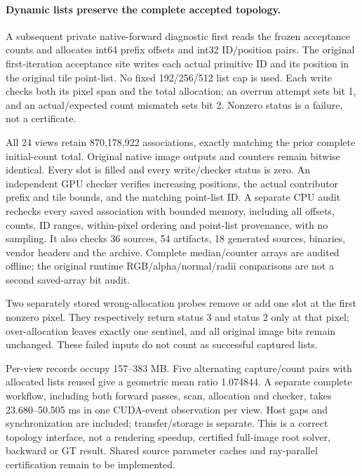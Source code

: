\documentclass[11pt,a4paper]{article}
\begin{document}
\paragraph{Dynamic lists preserve the complete accepted topology.}
A subsequent private native-forward diagnostic first reads the frozen
acceptance counts and allocates int64 prefix offsets and int32 ID/position
pairs. The original first-iteration acceptance site writes each actual
primitive ID and its position in the original tile point-list. No fixed
192/256/512 list cap is used. Each write checks both its pixel span and
the total allocation; an overrun attempt sets bit 1, and an actual/expected
count mismatch sets bit 2. Nonzero status is a failure, not a certificate.

All 24 views retain 870,178,922 associations, exactly matching the prior
complete initial-count total. Original native image outputs and counters
remain bitwise identical. Every slot is filled and every write/checker
status is zero. An independent GPU checker verifies increasing positions,
the actual contributor prefix and tile bounds, and the matching point-list
ID. A separate CPU audit rechecks every saved association with bounded
memory, including all offsets, counts, ID ranges, within-pixel ordering and
point-list provenance, with no sampling. It also checks 36 sources, 54
artifacts, 18 generated sources, binaries, vendor headers and the archive.
Complete median/counter arrays are audited offline; the original runtime
RGB/alpha/normal/radii comparisons are not a second saved-array bit audit.

Two separately stored wrong-allocation probes remove or add one slot at
the first nonzero pixel. They respectively return status 3 and status 2
only at that pixel; over-allocation leaves exactly one sentinel, and all
original image bits remain unchanged. These failed inputs do not count
as successful captured lists.

Per-view records occupy 157--383 MB. Five alternating capture/count pairs
with allocated lists reused give a geometric mean ratio 1.074844.
A separate complete workflow, including both forward passes, scan,
allocation and checker, takes 23.680--50.505 ms in one CUDA-event observation
per view. Host gaps and synchronization are included; transfer/storage is
separate. This is a correct topology interface, not a rendering speedup,
certified full-image root solver, backward or GT result. Shared source
parameter caches and ray-parallel certification remain to be implemented.
\end{document}
